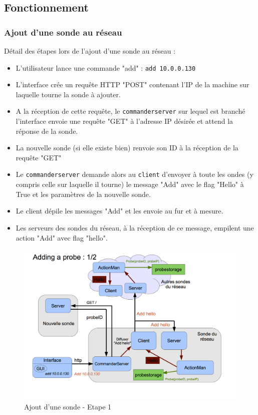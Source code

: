\documentclass[a4paper,11pt]{article}
\begin{document}
\FloatBarrier


\subsection{Fonctionnement}

\subsubsection{Ajout d'une sonde au réseau}

Détail des étapes lors de l'ajout d'une sonde au réseau :
\begin{itemize}
\item L'utilisateur lance une commande "add" : \texttt{add 10.0.0.130}
\item L'interface crée un requête HTTP "POST" contenant l'IP de la machine sur laquelle tourne la sonde à ajouter.
\item A la réception de cette requête, le \texttt{commanderserver} sur lequel est branché l'interface envoie une requête "GET" à l'adresse IP désirée et attend la réponse de la sonde.
\item La nouvelle sonde (si elle existe bien) renvoie son ID à la réception de la requête "GET"
\item Le \texttt{commanderserver} demande alors au \texttt{client} d'envoyer à toute les ondes (y compris celle sur laquelle il tourne) le message "Add" avec le flag "Hello" à True et les paramètres de la nouvelle sonde.
\item Le client dépile les messages "Add" et les envoie au fur et à mesure.
\item Les serveurs des sondes du réseau, à la réception de ce message, empilent une action "Add" avec flag "hello".
\end{itemize}

\begin{figure}[!ht]
\centering\includegraphics[width=\linewidth]{img/graphAdd1.png}
\caption{Ajout d'une sonde - Etape 1}
\end{figure}
\end{document}
